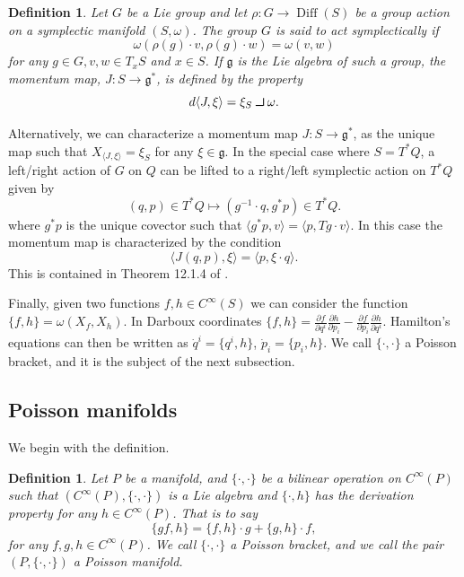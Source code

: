 \documentclass[12pt]{amsart}
\newcommand{\pder}[2]{\ensuremath{\frac{\partial #1}{\partial #2}}}
\def\contract{\makebox[1.2em][c]{\mbox{\rule{.6em}
{.01truein}\rule{.01truein}{.6em}}}}
\newtheorem{defn}[thm]{Definition}
\DeclareMathOperator{\Diff}{Diff}
\begin{document}
\begin{defn}
  Let $G$ be a Lie group and let $\rho:G \to \Diff(S)$ be a group action on a symplectic manifold $(S,\omega)$.
  The group $G$ is said to \emph{act symplectically} if
  \begin{equation*}
    \omega( \rho( g ) \cdot v , \rho(g) \cdot w) = \omega(v,w)
  \end{equation*}
  for any $g \in G, v,w \in T_xS$ and $x \in S$.
  If $\mathfrak{g}$ is the Lie algebra of such a group,
  the \emph{momentum map}, $J:S \to \mathfrak{g}^*$,
  is defined by the property
  \begin{equation*}
    d \langle J , \xi \rangle = \xi_S \contract \omega.
  \end{equation*}
\end{defn}

Alternatively, we can characterize a momentum map $J: S \to \mathfrak{g}^*$, as the unique map such that $X_{\langle J , \xi \rangle} = \xi_S$ for any $\xi \in \mathfrak{g}$.
In the special case where $S = T^*Q$, a left/right action of $G$ on $Q$ can be lifted to a right/left symplectic action on $T^*Q$ given by
\begin{equation*}
  (q,p) \in T^*Q \mapsto (g^{-1} \cdot q , g^* p) \in T^*Q.
\end{equation*}
where $g^*p$ is the unique covector such that $\langle g^*p , v \rangle = \langle p , Tg \cdot v \rangle$.
In this case the momentum map is characterized by the condition
\begin{equation}
  \langle J(q,p) , \xi \rangle = \langle p , \xi \cdot q \rangle.
  \label{eq:cotangent_momap}
\end{equation}
This is contained in Theorem 12.1.4 of \cite{MandS}.

Finally, given two functions $f,h \in C^{\infty}(S)$ we can consider the function $\{ f,h\} = \omega( X_f, X_h)$.
In Darboux coordinates $\{ f , h \} = \pder{f}{q^i} \pder{h}{p_i} - \pder{f}{p_i} \pder{h}{q^i}$.
Hamilton's equations can then be written as $\dot{q}^i = \{ q^i , h \}$,
$\dot{p}_i = \{ p_i , h \}$.
We call $\{ \cdot , \cdot \}$ a Poisson bracket, and it is the subject of
the next subsection.

\subsection{Poisson manifolds}
\label{sec:Poisson}
We begin with the definition.

\begin{defn} \label{defn:Poisson}
  Let $P$ be a manifold, and $\{ \cdot , \cdot \}$ be a bilinear
  operation on $C^{\infty}(P)$ such that 
  $( C^{\infty}(P) , \{ \cdot , \cdot \} )$ is a Lie algebra
  and $\{ \cdot , h \}$ has the derivation property for any $h \in C^{\infty}(P)$.
  That is to say
  \begin{equation*}
    \{ gf , h \} = \{ f , h \} \cdot g + \{ g , h \} \cdot f,
  \end{equation*}
  for any $f,g,h \in C^{\infty}(P)$.
  We call $\{ \cdot , \cdot \}$ a \emph{Poisson bracket},
  and we call the pair $(P, \{ \cdot , \cdot \})$ a Poisson manifold.
\end{defn}
\end{document}
